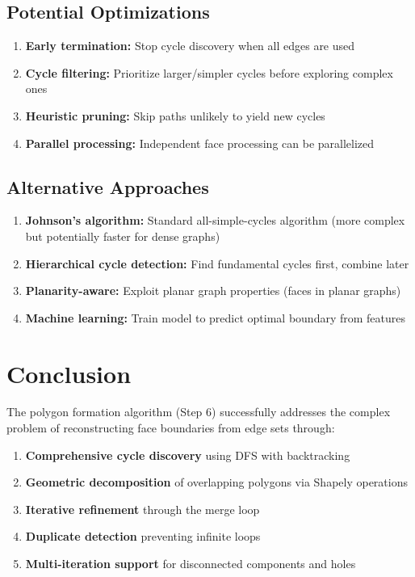\documentclass[11pt]{article}
\begin{document}
\subsection{Potential Optimizations}

\begin{enumerate}
    \item \textbf{Early termination:} Stop cycle discovery when all edges are used
    \item \textbf{Cycle filtering:} Prioritize larger/simpler cycles before exploring complex ones
    \item \textbf{Heuristic pruning:} Skip paths unlikely to yield new cycles
    \item \textbf{Parallel processing:} Independent face processing can be parallelized
\end{enumerate}

\subsection{Alternative Approaches}

\begin{enumerate}
    \item \textbf{Johnson's algorithm:} Standard all-simple-cycles algorithm (more complex but potentially faster for dense graphs)
    \item \textbf{Hierarchical cycle detection:} Find fundamental cycles first, combine later
    \item \textbf{Planarity-aware:} Exploit planar graph properties (faces in planar graphs)
    \item \textbf{Machine learning:} Train model to predict optimal boundary from features
\end{enumerate}

\section{Conclusion}

The polygon formation algorithm (Step 6) successfully addresses the complex problem of reconstructing face boundaries from edge sets through:

\begin{enumerate}
    \item \textbf{Comprehensive cycle discovery} using DFS with backtracking
    \item \textbf{Geometric decomposition} of overlapping polygons via Shapely operations
    \item \textbf{Iterative refinement} through the merge loop
    \item \textbf{Duplicate detection} preventing infinite loops
    \item \textbf{Multi-iteration support} for disconnected components and holes
\end{enumerate}
\end{document}
